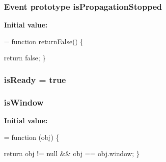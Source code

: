 \subsubsection[{\texorpdfstring{is\+Propagation\+Stopped}{isPropagationStopped}}]{ {\bf Event} {\bf prototype} is\+Propagation\+Stopped}\hypertarget{jquery-2_82_81-vsdoc_8js_a67f2430529d27bb55dbfa279dc2899ea}{}\label{jquery-2_82_81-vsdoc_8js_a67f2430529d27bb55dbfa279dc2899ea}
{\bfseries Initial value\+:}
\begin{DoxyCode}
= \textcolor{keyword}{function} returnFalse() \{
        

        \textcolor{keywordflow}{return} \textcolor{keyword}{false};
    \}
\end{DoxyCode}
\subsubsection[{\texorpdfstring{is\+Ready}{isReady}}]{ is\+Ready = true}\hypertarget{jquery-2_82_81-vsdoc_8js_a797716c9b47d0a75c110b3852c7f25af}{}\label{jquery-2_82_81-vsdoc_8js_a797716c9b47d0a75c110b3852c7f25af}
\subsubsection[{\texorpdfstring{is\+Window}{isWindow}}]{ is\+Window}\hypertarget{jquery-2_82_81-vsdoc_8js_a6f58346d2509049e6186d923c99f005a}{}\label{jquery-2_82_81-vsdoc_8js_a6f58346d2509049e6186d923c99f005a}
{\bfseries Initial value\+:}
\begin{DoxyCode}
= \textcolor{keyword}{function} (obj) \{
        

        \textcolor{keywordflow}{return} obj != null && obj == obj.window;
    \}
\end{DoxyCode}
